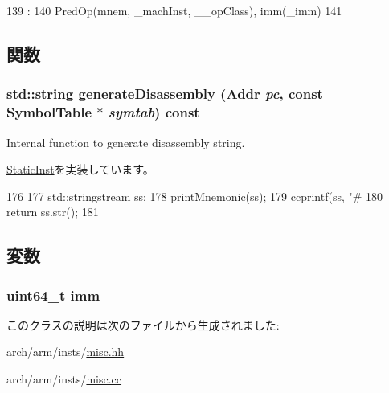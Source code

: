 \begin{DoxyCode}
139                             :
140         PredOp(mnem, _machInst, __opClass), imm(_imm)
141     {}

\end{DoxyCode}


\subsection{関数}
\hypertarget{classImmOp_a95d323a22a5f07e14d6b4c9385a91896}{
\subsubsection[{generateDisassembly}]{\setlength{\rightskip}{0pt plus 5cm}std::string generateDisassembly ({\bf Addr} {\em pc}, \/  const SymbolTable $\ast$ {\em symtab}) const}}
\label{classImmOp_a95d323a22a5f07e14d6b4c9385a91896}
Internal function to generate disassembly string. 

\hyperlink{classStaticInst_ab4a569d2623620c04f8a52bbd91d63b9}{StaticInst}を実装しています。


\begin{DoxyCode}
176 {
177     std::stringstream ss;
178     printMnemonic(ss);
179     ccprintf(ss, "#%
180     return ss.str();
181 }
\end{DoxyCode}


\subsection{変数}
\hypertarget{classImmOp_a2b4406ad2843b5aa12d244d01d8fdc69}{
\subsubsection[{imm}]{\setlength{\rightskip}{0pt plus 5cm}uint64\_\-t {\bf imm}}}
\label{classImmOp_a2b4406ad2843b5aa12d244d01d8fdc69}


このクラスの説明は次のファイルから生成されました:\begin{DoxyCompactItemize}
\item 
arch/arm/insts/\hyperlink{arch_2arm_2insts_2misc_8hh}{misc.hh}\item 
arch/arm/insts/\hyperlink{arch_2arm_2insts_2misc_8cc}{misc.cc}\end{DoxyCompactItemize}
